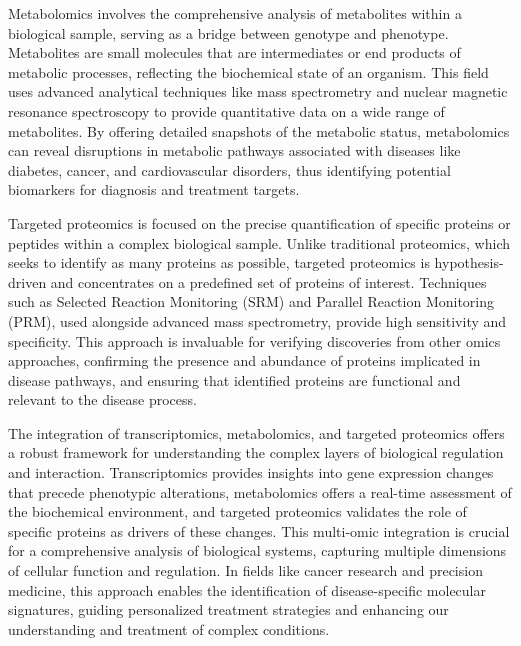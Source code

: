 Metabolomics involves the comprehensive analysis of metabolites within a biological sample, serving as a bridge between genotype and phenotype. Metabolites are small molecules that are intermediates or end products of metabolic processes, reflecting the biochemical state of an organism. This field uses advanced analytical techniques like mass spectrometry and nuclear magnetic resonance spectroscopy to provide quantitative data on a wide range of metabolites. By offering detailed snapshots of the metabolic status, metabolomics can reveal disruptions in metabolic pathways associated with diseases like diabetes, cancer, and cardiovascular disorders, thus identifying potential biomarkers for diagnosis and treatment targets.

Targeted proteomics is focused on the precise quantification of specific proteins or peptides within a complex biological sample. Unlike traditional proteomics, which seeks to identify as many proteins as possible, targeted proteomics is hypothesis-driven and concentrates on a predefined set of proteins of interest. Techniques such as Selected Reaction Monitoring (SRM) and Parallel Reaction Monitoring (PRM), used alongside advanced mass spectrometry, provide high sensitivity and specificity. This approach is invaluable for verifying discoveries from other omics approaches, confirming the presence and abundance of proteins implicated in disease pathways, and ensuring that identified proteins are functional and relevant to the disease process.

The integration of transcriptomics, metabolomics, and targeted proteomics offers a robust framework for understanding the complex layers of biological regulation and interaction. Transcriptomics provides insights into gene expression changes that precede phenotypic alterations, metabolomics offers a real-time assessment of the biochemical environment, and targeted proteomics validates the role of specific proteins as drivers of these changes. This multi-omic integration is crucial for a comprehensive analysis of biological systems, capturing multiple dimensions of cellular function and regulation. In fields like cancer research and precision medicine, this approach enables the identification of disease-specific molecular signatures, guiding personalized treatment strategies and enhancing our understanding and treatment of complex conditions.